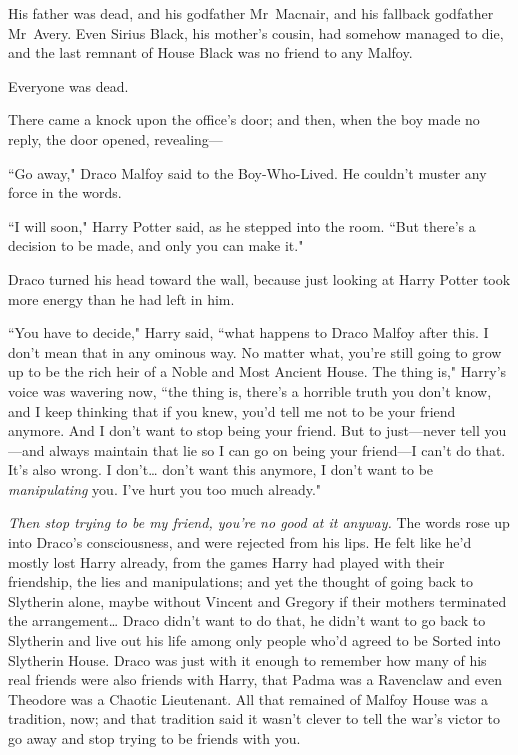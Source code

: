 His father was dead, and his godfather Mr~Macnair, and his fallback godfather Mr~Avery. Even Sirius Black, his mother's cousin, had somehow managed to die, and the last remnant of House Black was no friend to any Malfoy.

Everyone was dead.

There came a knock upon the office's door; and then, when the boy made no reply, the door opened, revealing—

``Go away," Draco Malfoy said to the Boy-Who-Lived. He couldn't muster any force in the words.

``I will soon," Harry Potter said, as he stepped into the room. ``But there's a decision to be made, and only you can make it."

Draco turned his head toward the wall, because just looking at Harry Potter took more energy than he had left in him.

``You have to decide," Harry said, ``what happens to Draco Malfoy after this. I don't mean that in any ominous way. No matter what, you're still going to grow up to be the rich heir of a Noble and Most Ancient House. The thing is," Harry's voice was wavering now, ``the thing is, there's a horrible truth you don't know, and I keep thinking that if you knew, you'd tell me not to be your friend anymore. And I don't want to stop being your friend. But to just—never tell you—and always maintain that lie so I can go on being your friend—I can't do that. It's also wrong. I don't{\ldots} don't want this anymore, I don't want to be \emph{manipulating} you. I've hurt you too much already."

\emph{Then stop trying to be my friend, you're no good at it anyway.} The words rose up into Draco's consciousness, and were rejected from his lips. He felt like he'd mostly lost Harry already, from the games Harry had played with their friendship, the lies and manipulations; and yet the thought of going back to Slytherin alone, maybe without Vincent and Gregory if their mothers terminated the arrangement{\ldots} Draco didn't want to do that, he didn't want to go back to Slytherin and live out his life among only people who'd agreed to be Sorted into Slytherin House. Draco was just with it enough to remember how many of his real friends were also friends with Harry, that Padma was a Ravenclaw and even Theodore was a Chaotic Lieutenant. All that remained of Malfoy House was a tradition, now; and that tradition said it wasn't clever to tell the war's victor to go away and stop trying to be friends with you.

